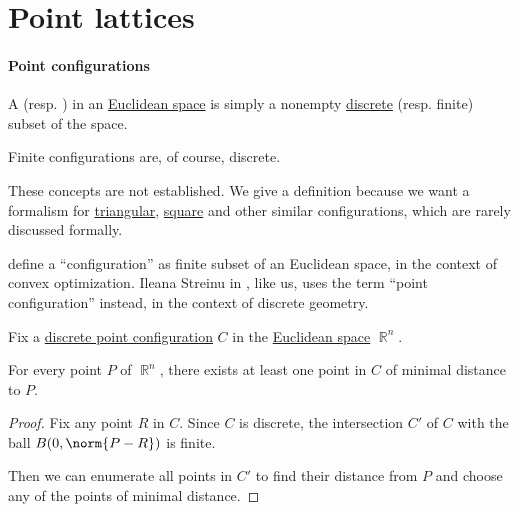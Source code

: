 \section{Point lattices}\label{sec:point_lattices}

\paragraph{Point configurations}

\begin{definition}\label{def:point_configuration}\mimprovised
  A  (resp. )  in an \hyperref[def:euclidean_space]{Euclidean space} is simply a nonempty \hyperref[def:discrete_set]{discrete} (resp. finite) subset of the space.
\end{definition}
\begin{comments}
  \item Finite configurations are, of course, discrete.

  \item These concepts are not established. We give a definition because we want a formalism for \hyperref[def:triangular_point_configuration]{triangular}, \hyperref[def:hypercubic_point_configuration]{square} and other similar configurations, which are rarely discussed formally.

  \item {} define a \enquote{configuration} as finite subset of an Euclidean space, in the context of convex optimization. Ileana Streinu in \cite[395]{Rosen2018DiscreteHandbook}, like us, uses the term \enquote{point configuration} instead, in the context of discrete geometry.
\end{comments}

\begin{proposition}\label{thm:point_configuration_finiteness}
  Fix a \hyperref[def:point_configuration]{discrete point configuration} \( C \) in the \hyperref[def:euclidean_space]{Euclidean space} \( \BbbR^n \).

  For every point \( P \) of \( \BbbR^n \), there exists at least one point in \( C \) of minimal distance to \( P \).
\end{proposition}
\begin{proof}
  Fix any point \( R \) in \( C \). Since \( C \) is discrete, the intersection \( C' \) of \( C \) with the ball \( B(0, \norm{P - R}) \) is finite.

  Then we can enumerate all points in \( C' \) to find their distance from \( P \) and choose any of the points of minimal distance.
\end{proof}

